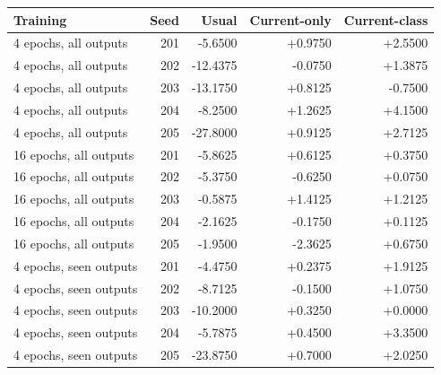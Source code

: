 \begin{tabular}{lrrrr}
\toprule
Training & Seed & Usual & Current-only & Current-class\\
\midrule
4 epochs, all outputs & 201 & -5.6500 & +0.9750 & +2.5500\\
4 epochs, all outputs & 202 & -12.4375 & -0.0750 & +1.3875\\
4 epochs, all outputs & 203 & -13.1750 & +0.8125 & -0.7500\\
4 epochs, all outputs & 204 & -8.2500 & +1.2625 & +4.1500\\
4 epochs, all outputs & 205 & -27.8000 & +0.9125 & +2.7125\\
16 epochs, all outputs & 201 & -5.8625 & +0.6125 & +0.3750\\
16 epochs, all outputs & 202 & -5.3750 & -0.6250 & +0.0750\\
16 epochs, all outputs & 203 & -0.5875 & +1.4125 & +1.2125\\
16 epochs, all outputs & 204 & -2.1625 & -0.1750 & +0.1125\\
16 epochs, all outputs & 205 & -1.9500 & -2.3625 & +0.6750\\
4 epochs, seen outputs & 201 & -4.4750 & +0.2375 & +1.9125\\
4 epochs, seen outputs & 202 & -8.7125 & -0.1500 & +1.0750\\
4 epochs, seen outputs & 203 & -10.2000 & +0.3250 & +0.0000\\
4 epochs, seen outputs & 204 & -5.7875 & +0.4500 & +3.3500\\
4 epochs, seen outputs & 205 & -23.8750 & +0.7000 & +2.0250\\
\bottomrule
\end{tabular}

